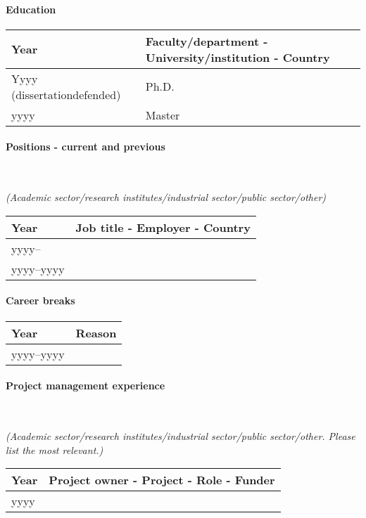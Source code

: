 \documentclass[cv,partner]{nfr}
\begin{document}
\paragraph{Education}
\begin{longtable}{|Y|F|}
    \hline
     Year & Faculty/department - University/institution - Country \\
    \hline
    Yyyy (dissertationdefended) & Ph.D. \\
    \hline
    yyyy & Master \\
    \hline
\end{longtable}

\paragraph{Positions - current and previous} ~

\noindent\textit{(Academic sector/research institutes/industrial sector/public
sector/other)}

\begin{longtable}{|Y|F|}
    \hline
     Year & Job title - Employer - Country \\
    \hline
    yyyy-- & ~ \\
    \hline
    yyyy--yyyy & ~ \\
    \hline
\end{longtable}

\paragraph{Career breaks}
\begin{longtable}{|Y|F|}
    \hline
     Year & Reason \\
    \hline
    yyyy--yyyy & ~ \\
    \hline
\end{longtable}

\paragraph{Project management experience} ~

\noindent\textit{(Academic sector/research institutes/industrial sector/public sector/other. Please list the most relevant.)}
\begin{longtable}{|Y|F|}
    \hline
     Year & Project owner - Project - Role - Funder \\
    \hline
    yyyy & ~ \\
    \hline
\end{longtable}
\end{document}
